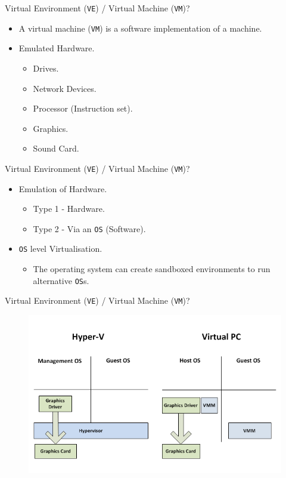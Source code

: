 \documentclass[aspectratio=169]{beamer}
\begin{document}
\begin{frame}{Virtual Environment (\texttt{VE}) / Virtual Machine (\texttt{VM})?}
  \begin{itemize}
    \item A virtual machine (\texttt{VM}) is a software implementation of a machine.
    \item Emulated Hardware.
    \begin{itemize}
      \item Drives.
      \item Network Devices.
      \item Processor (Instruction set).
      \item Graphics.
      \item Sound Card.
    \end{itemize}  
  \end{itemize}
\end{frame}

\begin{frame}{Virtual Environment (\texttt{VE}) / Virtual Machine (\texttt{VM})?}
  \begin{itemize}
    \item Emulation of Hardware.
      \begin{itemize}
        \item Type 1 - Hardware.
        \item Type 2 - Via an \texttt{OS} (Software).
      \end{itemize}  
    \item \texttt{OS} level Virtualisation.
      \begin{itemize}
        \item The operating system can create sandboxed environments to run alternative \texttt{OS}s.
      \end{itemize}
  \end{itemize}
\end{frame}

\begin{frame}{Virtual Environment (\texttt{VE}) / Virtual Machine (\texttt{VM})?}
  \begin{figure}
    \begin{center}
      \includegraphics[width=.7\linewidth]{Comparison.png}
    \end{center}
  \end{figure}
\end{frame}
\end{document}
